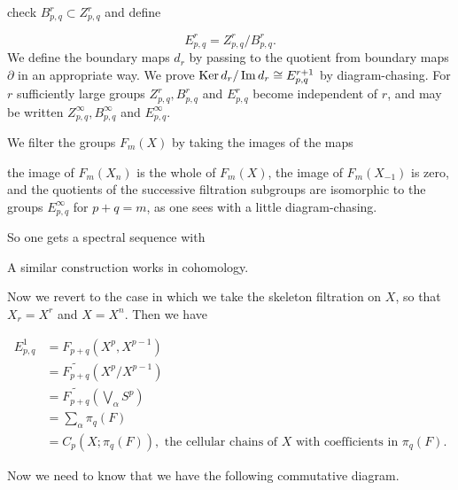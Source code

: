 \documentclass[../main]{subfiles}
\begin{document}
check $B_{p,q}^r\subset Z_{p,q}^r$ and define

\begin{equation*}
    E_{p,q}^r=Z_{p,q}^r/B_{p,q}^r.
\end{equation*}
We define the boundary maps $d_r$ by passing to the quotient from boundary maps $\partial$ in an appropriate way. We prove $\mathop{\mathrm{Ker}}d_r/\mathop{\mathrm{Im}}d_r\cong E_{p,q}^{r+1}$ by diagram-chasing. For $r$ sufficiently large groups $Z_{p,q}^r,B_{p,q}^r$ and $E_{p,q}^r$ become independent of $r$, and may be written $Z_{p,q}^{\infty},B_{p,q}^{\infty}$ and $E_{p,q}^{\infty}$.

We filter the groups $F_m(X)$ by taking the images of the maps
\begin{center}
\end{center}

the image of $F_m(X_n)$ is the whole of $F_m(X)$, the image of $F_m(X_{-1})$ is zero, and the quotients of the successive filtration subgroups are isomorphic to the groups $E_{p,q}^{\infty}$ for $p+q=m$, as one sees with a little diagram-chasing.

So one gets a spectral sequence with 

\begin{center}
\end{center}

A similar construction works in cohomology.

Now we revert to the case in which we take the skeleton filtration on $X$, so that $X_r=X^r$ and $X=X^n$. Then we have

\begin{align*}
    E_{p,q}^1&=F_{p+q}(X^p,X^{p-1})\\
    &=\widetilde{F_{p+q}}(X^p/X^{p-1})\\
    &=\widetilde{F_{p+q}}\left(\bigvee_\alpha S^p\right)\\
    &=\sum_{\alpha}\pi_q(F)\\
    &=C_p(X;\pi_q(F)),\text{ the cellular chains of }X\text{ with coefficients in }\pi_q(F).
\end{align*}

Now we need to know that we have the following commutative diagram. 
\end{document}
